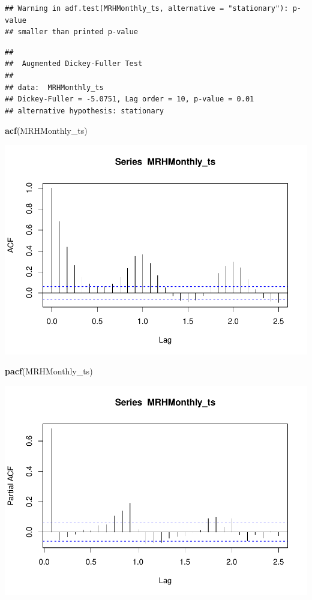\documentclass[12pt,]{article}
\newenvironment{Shaded}{\begin{snugshade}}{\end{snugshade}}
\newcommand{\KeywordTok}[1]{\textcolor[rgb]{0.13,0.29,0.53}{\textbf{#1}}}
\newcommand{\NormalTok}[1]{#1}
\begin{document}
\begin{verbatim}
## Warning in adf.test(MRHMonthly_ts, alternative = "stationary"): p-value
## smaller than printed p-value
\end{verbatim}

\begin{verbatim}
## 
##  Augmented Dickey-Fuller Test
## 
## data:  MRHMonthly_ts
## Dickey-Fuller = -5.0751, Lag order = 10, p-value = 0.01
## alternative hypothesis: stationary
\end{verbatim}

\begin{Shaded}
\begin{Highlighting}[]
\KeywordTok{acf}\NormalTok{(MRHMonthly_ts)}
\end{Highlighting}
\end{Shaded}

\includegraphics{Project_Template_files/figure-latex/unnamed-chunk-6-14.pdf}

\begin{Shaded}
\begin{Highlighting}[]
\KeywordTok{pacf}\NormalTok{(MRHMonthly_ts)}
\end{Highlighting}
\end{Shaded}

\includegraphics{Project_Template_files/figure-latex/unnamed-chunk-6-15.pdf}
\end{document}
